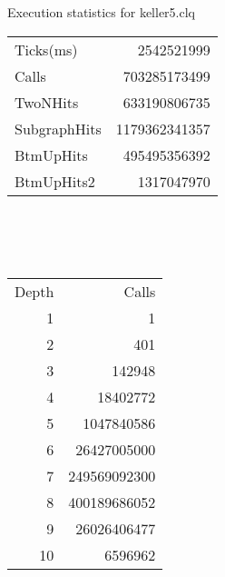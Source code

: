 \documentclass[landscape]{slides}
\begin{document}
\begin{slide}
	\begin{center}
		Execution statistics for keller5.clq
	\end{center}
	\begin{tabular}{ l r }
		Ticks(ms) & 2542521999 \\
		Calls & 703285173499 \\
		TwoNHits & 633190806735 \\
		SubgraphHits & 1179362341357 \\
		BtmUpHits & 495495356392 \\
		BtmUpHits2 & 1317047970 \\
	\end{tabular}
	\\ \\ \\
	\begin{tabular}{ r r }
		Depth &		 Calls \\
		1 &               1 \\
		2 &             401 \\
		3 &          142948 \\
		4 &        18402772 \\
		5 &      1047840586 \\
		6 &     26427005000 \\
		7 &    249569092300 \\
		8 &    400189686052 \\
		9 &     26026406477 \\
		10 &        6596962  \\
	\end{tabular}
\end{slide}
\end{document}
